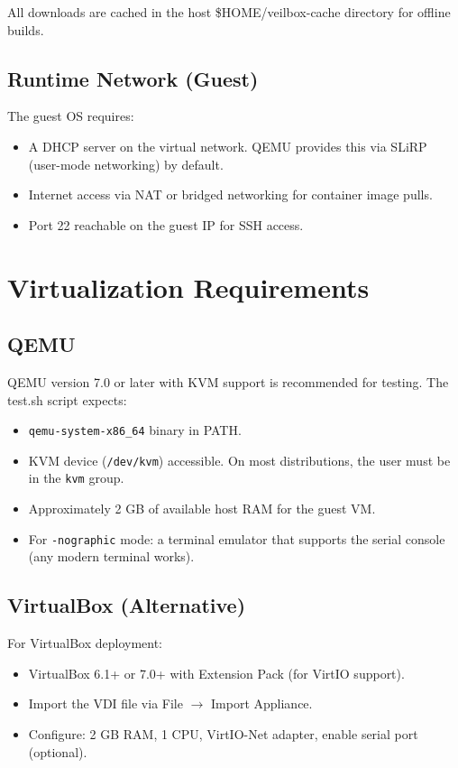 All downloads are cached in the host \$HOME/veilbox-cache directory
for offline builds.

\subsection{Runtime Network (Guest)}

The guest OS requires:
\begin{itemize}[nosep]
  \item A DHCP server on the virtual network. QEMU provides this via
        SLiRP (user-mode networking) by default.
  \item Internet access via NAT or bridged networking for container image
        pulls.
  \item Port 22 reachable on the guest IP for SSH access.
\end{itemize}

\section{Virtualization Requirements}

\subsection{QEMU}

QEMU version 7.0 or later with KVM support is recommended for testing.
The test.sh script expects:

\begin{itemize}[nosep]
  \item \texttt{qemu-system-x86\_64} binary in PATH.
  \item KVM device (\texttt{/dev/kvm}) accessible. On most distributions,
        the user must be in the \texttt{kvm} group.
  \item Approximately 2 GB of available host RAM for the guest VM.
  \item For \texttt{-nographic} mode: a terminal emulator that supports
        the serial console (any modern terminal works).
\end{itemize}

\subsection{VirtualBox (Alternative)}

For VirtualBox deployment:
\begin{itemize}[nosep]
  \item VirtualBox 6.1+ or 7.0+ with Extension Pack (for VirtIO support).
  \item Import the VDI file via File $\rightarrow$ Import Appliance.
  \item Configure: 2 GB RAM, 1 CPU, VirtIO-Net adapter, enable serial
        port (optional).
\end{itemize}

